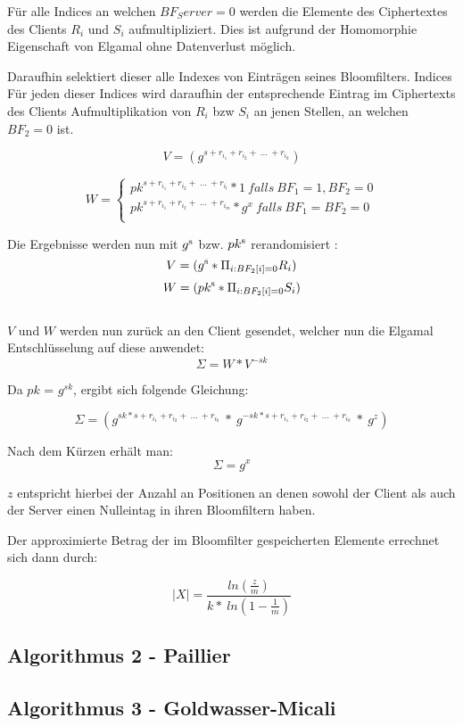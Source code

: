 Für alle Indices an welchen $BF_Server = 0$ werden die Elemente des Ciphertextes des Clients $R_i$ und $S_i$ aufmultipliziert.
Dies ist aufgrund der Homomorphie Eigenschaft von Elgamal ohne Datenverlust möglich.

Daraufhin selektiert dieser alle Indexes von Einträgen seines Bloomfilters. Indices 
Für jeden dieser Indices wird daraufhin der entsprechende Eintrag im Ciphertexts des Clients 
Aufmultiplikation  von $R_i$ bzw $S_i$ an jenen Stellen, an welchen $BF_2 = 0$ ist.

$$ V = (g^{s + r_{i_{1}} + r_{i_{2}} + \ ...\ +r_{i_{k}}})$$

\[
W =\left\{
\begin{array}{ll}
pk^{s + r_{i_{1}} + r_{i_{2}} + \ ...\ +r_{i_{l}}}*1 \ falls \ BF_{1} = 1,BF_{2} = 0 \\
pk^{s + r_{i_{1}} + r_{i_{2}} + \ ...\ +r_{i_{m}}}*g^{x} \ falls \ BF_{1} = BF_{2} = 0\\
\end{array}
\right.
\]

Die Ergebnisse werden nun mit $ g \textsuperscript{s}  $ bzw. $ pk \textsuperscript{s} $ rerandomisiert :
$$ V = (g \textsuperscript{s} * \Pi_{i:BF_{2}[i] = 0} R_{i} )$$
$$ W = (pk \textsuperscript{s} * \Pi_{i:BF_{2}[i] = 0} S_{i} )$$ \\
$ V $ und $ W $ werden nun zurück an den Client gesendet, welcher nun die Elgamal Entschlüsselung auf diese anwendet:
$$\Sigma = W * V^{-sk}$$

Da $pk$ = $g^{sk}$, ergibt sich folgende Gleichung:
	
$$\Sigma = (g^{sk * s + r_{i_{1}} + r_{i_{2}} + \ ...\ +r_{i_{k}}} \ * \ g^{-sk * s + r_{i_{1}} + r_{i_{2}} + \ ...\ +r_{i_{k}}} \ * \ g^z) $$


Nach dem Kürzen erhält man:
$$\Sigma = g^x$$

$ z $ entspricht hierbei der Anzahl  an Positionen an denen sowohl der Client als auch der Server einen Nulleintag in ihren Bloomfiltern haben.

Der approximierte Betrag der im Bloomfilter gespeicherten Elemente errechnet sich dann durch:

$$ |X| = \frac{ln( \frac{z}{m})}{k* \ ln(1- \frac{1}{m})}$$



\subsection{Algorithmus 2 - Paillier}
\label{sec:Sec2.3}




\subsection{Algorithmus 3 - Goldwasser-Micali}
\label{sec:Sec2.4}






